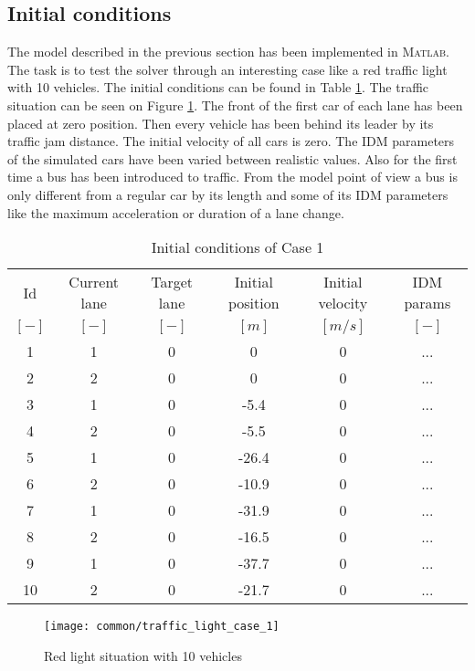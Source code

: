 		\subsection*{Initial conditions}
		The model described in the previous section has been implemented in \textsc{Matlab}. The task is to test the solver through an interesting case like a red traffic light with 10 vehicles. The initial conditions can be found in Table \ref{tab:case_1_definition_array}. The traffic situation can be seen on Figure \ref{fig:red_light_situation}. The front of the first car of each lane has been placed at zero position. Then every vehicle has been behind its leader by its traffic jam distance. The initial velocity of all cars is zero.  The IDM parameters of the simulated cars have been varied between realistic values. Also for the first time a bus has been introduced to traffic. From the model point of view a bus is only different from a regular car by its length and some of its IDM parameters like the maximum acceleration or duration of a lane change.
		\begin{table}
			\begin{center}
				\begin{tabular}{ |c|c|c|c|c|c| }
					\hline
					Id & Current lane & Target lane & Initial position & Initial velocity& IDM params\\
					$[-]$ & $[-]$ & $[-]$ & $[m]$ & $[m/s]$ & $[-]$\\
					\hline
					1 & 1 & 0 & 0 & 0 & ...\\
					2 & 2 & 0 & 0 & 0 & ...\\
					3 & 1 & 0 & -5.4 & 0 & ...\\
					4 & 2 & 0 & -5.5 & 0 & ...\\
					5 & 1 & 0 & -26.4 & 0 & ...\\
					6 & 2 & 0 & -10.9 & 0 & ...\\
					7 & 1 & 0 & -31.9 & 0 & ...\\
					8 & 2 & 0 & -16.5 & 0 & ...\\
					9 & 1 & 0 & -37.7 & 0 & ...\\
					10 & 2 & 0 & -21.7 & 0 & ...\\
					\hline
				\end{tabular}
			\end{center}
			\caption{Initial conditions of Case 1}
			\label{tab:case_1_definition_array}
		\end{table}
		\begin{figure}
			\centering
			\texttt{[image: common/traffic\_light\_case\_1]}
			\caption{Red light situation with 10 vehicles}
			\label{fig:red_light_situation}
		\end{figure}

